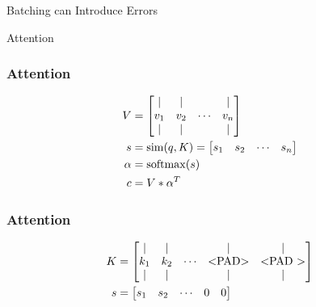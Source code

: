\documentclass{beamer}
\newcommand{\softmax}{\mathop{\rm softmax}\nolimits}
\newcommand{\similar}{\mathop{\rm sim}\nolimits}
\begin{document}
\begin{section}{Batching can Introduce Errors}
\begin{subsection}{Attention}
        \begin{frame}
            \frametitle{Attention}
            \begin{align*}
                V &= \begin{bmatrix}
                         \vert & \vert & & \vert \\
                         v_1 & v_2 & \cdots & v_n \\
                         \vert & \vert & & \vert
                     \end{bmatrix} \\
                s &= \similar(q, K) = \begin{bmatrix}
                        s_1 & s_2 & \cdots & s_n \\
                    \end{bmatrix} \\
                \alpha &= \softmax(s) \\
                c &= V * \alpha^{T} \\
            \end{align*}
        \end{frame}

        \begin{frame}
            \frametitle{Attention}

            \begin{align*}
                K &= \begin{bmatrix}
                        \vert & \vert & & \vert & \vert \\
                        k_1 & k_2 & \cdots & \text{\textless PAD\textgreater} & \text{\textless PAD \textgreater} \\
                        \vert & \vert & & \vert & \vert \\
                     \end{bmatrix} \\
                s &= \begin{bmatrix}
                        s_1 & s_2 & \cdots & 0 & 0
                     \end{bmatrix}
            \end{align*}


\end{frame}
\end{subsection}
\end{section}
\end{document}
